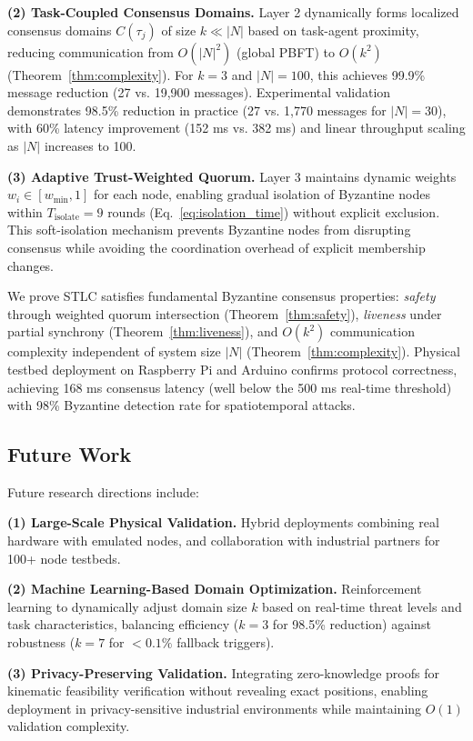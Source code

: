 \documentclass[lettersize,journal]{IEEEtran}
\begin{document}
 

\textbf{(2) Task-Coupled Consensus Domains.} Layer 2 dynamically forms
localized consensus domains $C(\tau_j)$ of size $k \ll |N|$ based on
task-agent proximity, reducing communication from $O(|N|^2)$ (global PBFT)
to $O(k^2)$ (Theorem~\ref{thm:complexity}). For $k=3$ and $|N|=100$, this
achieves 99.9\% message reduction (27 vs. 19,900 messages). Experimental
validation demonstrates 98.5\% reduction in practice (27 vs. 1,770 messages
for $|N|=30$), with 60\% latency improvement (152 ms vs. 382 ms) and linear
throughput scaling as $|N|$ increases to 100.

\textbf{(3) Adaptive Trust-Weighted Quorum.} Layer 3 maintains dynamic
weights $w_i \in [w_{\min}, 1]$ for each node, enabling gradual isolation
of Byzantine nodes within $T_{\text{isolate}} = 9$ rounds
(Eq.~\ref{eq:isolation_time}) without explicit exclusion. This soft-isolation
mechanism prevents Byzantine nodes from disrupting consensus while avoiding
the coordination overhead of explicit membership changes.

 

We prove STLC satisfies fundamental Byzantine consensus properties:
\textit{safety} through weighted quorum intersection
(Theorem~\ref{thm:safety}), \textit{liveness} under partial synchrony
(Theorem~\ref{thm:liveness}), and $O(k^2)$ communication complexity
independent of system size $|N|$ (Theorem~\ref{thm:complexity}). Physical
testbed deployment on Raspberry Pi and Arduino confirms protocol correctness,
achieving 168 ms consensus latency (well below the 500 ms real-time threshold)
with 98\% Byzantine detection rate for spatiotemporal attacks.

\subsection{Future Work}
\label{sec:future}
Future research directions include:

\textbf{(1) Large-Scale Physical Validation.} Hybrid deployments combining 
real hardware with emulated nodes, and collaboration with industrial 
partners for 100+ node testbeds.

\textbf{(2) Machine Learning-Based Domain Optimization.} Reinforcement
learning to dynamically adjust domain size $k$ based on real-time threat
levels and task characteristics, balancing efficiency ($k=3$ for 98.5\%
reduction) against robustness ($k=7$ for $< 0.1\%$ fallback triggers).

\textbf{(3) Privacy-Preserving Validation.} Integrating zero-knowledge
proofs for kinematic feasibility verification without revealing exact
positions, enabling deployment in privacy-sensitive industrial environments
while maintaining $O(1)$ validation complexity.
\end{document}
